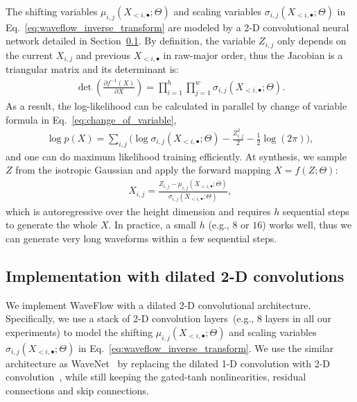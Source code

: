 \documentclass{article}
\begin{document}
The shifting variables $\mu_{i,j}(X_{<i, \bullet}; \Theta)$ and scaling variables $\sigma_{i,j} (X_{<i, \bullet}; \Theta)$ in Eq.~\eqref{eq:waveflow_inverse_transform} are modeled by a 2-D convolutional neural network detailed in Section~\ref{subsec:conv2d}.
By definition, the variable $Z_{i, j}$ only depends on the current $X_{i, j}$ and previous $X_{<i, \bullet}$ in raw-major order, thus the Jacobian is a triangular matrix and its determinant is:
\begin{align}
\det\left( \frac{\partial f^{-1}(X) }{\partial X} \right) = \prod_{i=1}^{h}\prod_{j=1}^{w} \sigma_{i, j} (X_{<i, \bullet}; \Theta).
\end{align}
As a result, the log-likelihood can be calculated in parallel by change of variable formula in  Eq.~\eqref{eq:change_of_variable},
\begin{align}
\log p(X) = \sum_{i, j} \Big( \log \sigma_{i, j} (X_{<i, \bullet}; \Theta) -   \frac{Z_{i, j}^2}{2} - \frac{1}{2}\log(2\pi) \Big), \nonumber
\end{align}
and one can do maximum likelihood training efficiently.
At synthesis, we sample $Z$ from the isotropic Gaussian and apply the forward mapping $X = f(Z; \Theta)$:
\begin{align}
\label{eq:waveflow_forward}
X_{i,j} = \frac{Z_{i, j} - \mu_{i,j}(X_{<i, \bullet}; \Theta)} {\sigma_{i,j} (X_{<i, \bullet}; \Theta)},
\end{align}
which is autoregressive over the height dimension and requires $h$ sequential steps to generate the whole $X$. In practice, a small $h$ (e.g., $8$ or $16$) works well, thus we can generate very long waveforms within a few sequential steps.



\vspace{-.2em}
\subsection{Implementation with dilated 2-D convolutions}
\label{subsec:conv2d}
\vspace{-.1em}
We implement WaveFlow with a dilated 2-D convolutional architecture.
Specifically, we use a stack of 2-D convolution layers~(e.g., 8 layers in all our experiments) to model the shifting $\mu_{i,j}(X_{<i, \bullet}; \Theta)$ and scaling variables $\sigma_{i,j} (X_{<i, \bullet}; \Theta)$ in Eq.~\eqref{eq:waveflow_inverse_transform}. 
We use the similar architecture as WaveNet~\citep{oord2016wavenet} by replacing the dilated 1-D convolution with 2-D convolution~\citep{yu2015multi}, while still keeping the gated-tanh nonlinearities, residual connections and skip connections.
\end{document}
